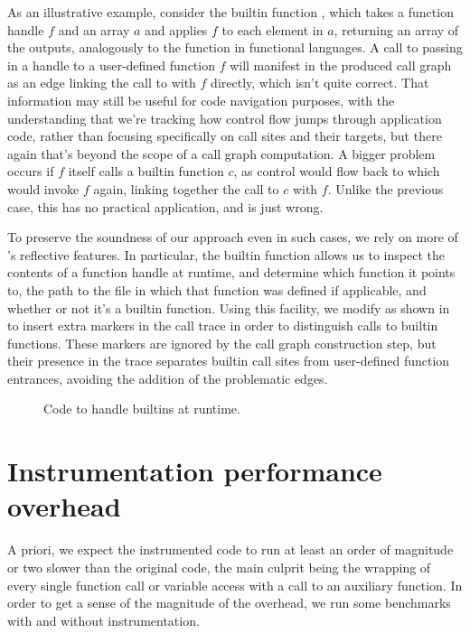 As an illustrative example, consider the builtin function ,
which takes a function handle $f$ and an array $a$ and applies $f$ to each
element in $a$, returning an array of the outputs, analogously to the
 function in functional languages. A call to  passing
in a handle to a user-defined function $f$ will manifest in the produced call
graph as an edge linking the call to  with $f$ directly, which
isn't quite correct. That information may still be useful for code navigation
purposes, with the understanding that we're tracking how control flow jumps
through application code, rather than focusing specifically on call sites and
their targets, but there again that's beyond the scope of a call graph
computation. A bigger problem occurs if $f$ itself calls a builtin function
$c$, as control would flow back to  which would invoke $f$
again, linking together the call to $c$ with $f$. Unlike the previous case,
this has no practical application, and is just wrong.

To preserve the soundness of our approach even in such cases, we rely on more
of \matlab's reflective features. In particular, the  builtin
function allows us to inspect the contents of a function handle at runtime, and
determine which function it points to, the path to the file in which that
function was defined if applicable, and whether or not it's a builtin function.
Using this facility, we modify  as shown
in  to insert extra markers in the call trace in
order to distinguish calls to builtin functions. These markers are ignored by
the call graph construction step, but their presence in the trace separates
builtin call sites from user-defined function entrances, avoiding the addition
of the problematic edges.

\begin{figure}[htbp]
  
\caption{Code to handle builtins at runtime.}
\label{Fig:LogThenRunBuiltin}
\end{figure}

\section{Instrumentation performance overhead}

A priori, we expect the instrumented code to run at least an order of magnitude
or two slower than the original code, the main culprit being the wrapping of
every single function call or variable access with a call to an auxiliary
function. In order to get a sense of the magnitude of the overhead, we run some
benchmarks with and without instrumentation.

